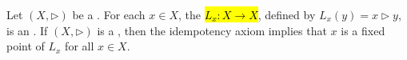 \begin{definition} \label{definition:left_translation_map_of_a_rack_by_an_element}
Let $(X, \rhd)$ be a . For each $x \in X$, the  \hl{$L_x: X \to X$}, defined by $L_x(y) = x \rhd y$, is an . 
If $(X, \rhd)$ is a , then the idempotency axiom implies that $x$ is a fixed point of $L_x$ for all $x \in X$.
\end{definition}